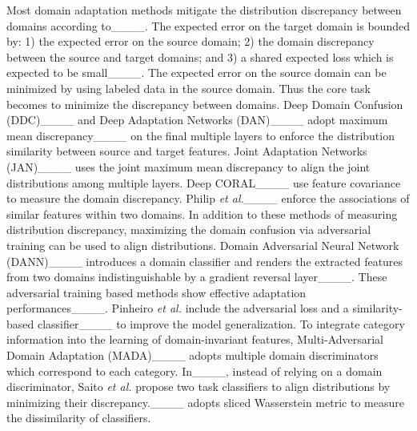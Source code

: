 Most domain adaptation methods mitigate the distribution discrepancy between domains according to____. The expected error on the target domain is bounded by: 1) the expected error on the source domain; 2) the domain discrepancy between the source and target domains; and 3) a shared expected loss which is expected to be small____. The expected error on the source domain can be minimized by using labeled data in the source domain. Thus the core task becomes to minimize the discrepancy between domains. %
Deep Domain Confusion (DDC)____ and Deep Adaptation Networks (DAN)____ adopt maximum mean discrepancy____ on the final multiple layers to enforce the distribution similarity between source and target features. Joint Adaptation Networks (JAN)____ uses the joint maximum mean discrepancy to align the joint distributions among multiple layers. Deep CORAL____ use feature covariance to measure the domain discrepancy. Philip \textit{et al.}____ enforce the associations of similar features within two domains. In addition to these methods of measuring distribution discrepancy, maximizing the domain confusion via adversarial training can be used to align distributions. Domain Adversarial Neural Network (DANN)____ introduces a domain classifier and renders the extracted features from two domains indistinguishable by a gradient reversal layer____. These adversarial training based methods show effective adaptation performances____. Pinheiro \textit{et al.} include the adversarial loss and a similarity-based classifier____ to improve the model generalization. To integrate category information into the learning of domain-invariant features, Multi-Adversarial Domain Adaptation (MADA)____ adopts multiple domain discriminators which correspond to each category. In____, instead of relying on a domain discriminator, Saito \textit{et al.} propose two task classifiers to align distributions by minimizing their discrepancy.____ adopts sliced Wasserstein metric to measure the dissimilarity of classifiers.

